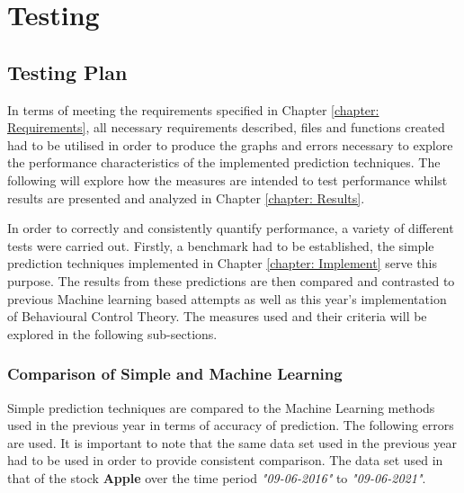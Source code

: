 \chapter{Testing}
\label{chapter: Testing}
\section{Testing Plan}
In terms of meeting the requirements specified in Chapter \ref{chapter: Requirements}, all necessary requirements described, files and functions created had to be utilised in order to produce the graphs and errors necessary to explore the performance characteristics of the implemented prediction techniques. The following will explore how the measures are intended to test performance whilst results are presented and analyzed in Chapter \ref{chapter: Results}. 

\noindent In order to correctly and consistently quantify performance, a variety of different tests were carried out. Firstly, a benchmark had to be established, the simple prediction techniques implemented in Chapter \ref{chapter: Implement} serve this purpose. The results from these predictions are then compared and contrasted to previous Machine learning based attempts as well as this year's implementation of Behavioural Control Theory. The measures used and their criteria will be explored in the following sub-sections.

\subsection{Comparison of Simple and Machine Learning}

Simple prediction techniques are compared to the Machine Learning methods used in the previous year \cite{ml_paper} in terms of accuracy of prediction. The following errors are used. It is important to note that the same data set used in the previous year had to be used in order to provide consistent comparison. The data set used in that of the stock \textbf{Apple} over the time period \textit{"09-06-2016"} to \textit{"09-06-2021"}.

